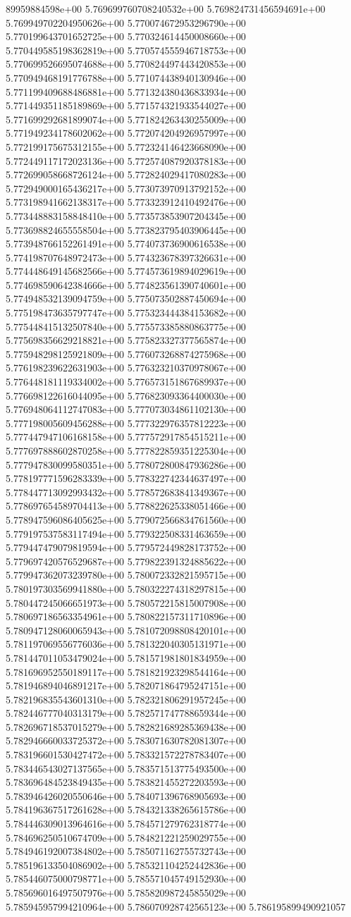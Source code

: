 89959884598e+00	5.769699760708240532e+00	5.769824731456594691e+00	5.769949702204950626e+00	5.770074672953296790e+00	5.770199643701652725e+00	5.770324614450008660e+00	5.770449585198362819e+00	5.770574555946718753e+00	5.770699526695074688e+00	5.770824497443420853e+00	5.770949468191776788e+00	5.771074438940130946e+00	5.771199409688486881e+00	5.771324380436833934e+00	5.771449351185189869e+00	5.771574321933544027e+00	5.771699292681899074e+00	5.771824263430255009e+00	5.771949234178602062e+00	5.772074204926957997e+00	5.772199175675312155e+00	5.772324146423668090e+00	5.772449117172023136e+00	5.772574087920378183e+00	5.772699058668726124e+00	5.772824029417080283e+00	5.772949000165436217e+00	5.773073970913792152e+00	5.773198941662138317e+00	5.773323912410492476e+00	5.773448883158848410e+00	5.773573853907204345e+00	5.773698824655558504e+00	5.773823795403906445e+00	5.773948766152261491e+00	5.774073736900616538e+00	5.774198707648972473e+00	5.774323678397326631e+00	5.774448649145682566e+00	5.774573619894029619e+00	5.774698590642384666e+00	5.774823561390740601e+00	5.774948532139094759e+00	5.775073502887450694e+00	5.775198473635797747e+00	5.775323444384153682e+00	5.775448415132507840e+00	5.775573385880863775e+00	5.775698356629218821e+00	5.775823327377565874e+00	5.775948298125921809e+00	5.776073268874275968e+00	5.776198239622631903e+00	5.776323210370978067e+00	5.776448181119334002e+00	5.776573151867689937e+00	5.776698122616044095e+00	5.776823093364400030e+00	5.776948064112747083e+00	5.777073034861102130e+00	5.777198005609456288e+00	5.777322976357812223e+00	5.777447947106168158e+00	5.777572917854515211e+00	5.777697888602870258e+00	5.777822859351225304e+00	5.777947830099580351e+00	5.778072800847936286e+00	5.778197771596283339e+00	5.778322742344637497e+00	5.778447713092993432e+00	5.778572683841349367e+00	5.778697654589704413e+00	5.778822625338051466e+00	5.778947596086405625e+00	5.779072566834761560e+00	5.779197537583117494e+00	5.779322508331463659e+00	5.779447479079819594e+00	5.779572449828173752e+00	5.779697420576529687e+00	5.779822391324885622e+00	5.779947362073239780e+00	5.780072332821595715e+00	5.780197303569941880e+00	5.780322274318297815e+00	5.780447245066651973e+00	5.780572215815007908e+00	5.780697186563354961e+00	5.780822157311710896e+00	5.780947128060065943e+00	5.781072098808420101e+00	5.781197069556776036e+00	5.781322040305131971e+00	5.781447011053479024e+00	5.781571981801834959e+00	5.781696952550189117e+00	5.781821923298544164e+00	5.781946894046891217e+00	5.782071864795247151e+00	5.782196835543601310e+00	5.782321806291957245e+00	5.782446777040313179e+00	5.782571747788659344e+00	5.782696718537015279e+00	5.782821689285369438e+00	5.782946660033725372e+00	5.783071630782081307e+00	5.783196601530427472e+00	5.783321572278783407e+00	5.783446543027137565e+00	5.783571513775493500e+00	5.783696484523849435e+00	5.783821455272203593e+00	5.783946426020550646e+00	5.784071396768905693e+00	5.784196367517261628e+00	5.784321338265615786e+00	5.784446309013964616e+00	5.784571279762318774e+00	5.784696250510674709e+00	5.784821221259029755e+00	5.784946192007384802e+00	5.785071162755732743e+00	5.785196133504086902e+00	5.785321104252442836e+00	5.785446075000798771e+00	5.785571045749152930e+00	5.785696016497507976e+00	5.785820987245855029e+00	5.785945957994210964e+00	5.786070928742565123e+00	5.786195899490921057